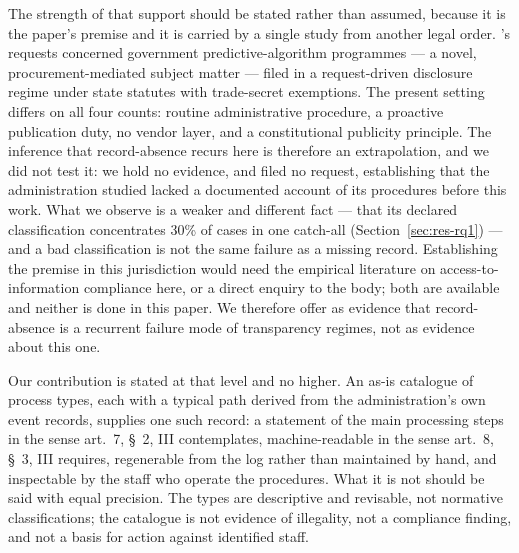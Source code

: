 The strength of that support should be stated rather than assumed, because it is the paper's
premise and it is carried by a single study from another legal order. \citeauthor{brauneis2018algorithmic}'s
requests concerned government predictive-algorithm programmes --- a novel, procurement-mediated
subject matter --- filed in a request-driven disclosure regime under state statutes with
trade-secret exemptions. The present setting differs on all four counts: routine administrative
procedure, a proactive publication duty, no vendor layer, and a constitutional publicity
principle. The inference that record-absence recurs here is therefore an extrapolation, and we
did not test it: we hold no evidence, and filed no request, establishing that the administration
studied lacked a documented account of its procedures before this work. What we observe is a
weaker and different fact --- that its declared classification concentrates 30\% of cases in one
catch-all (Section~\ref{sec:res-rq1}) --- and a bad classification is not the same failure as a
missing record. Establishing the premise in this jurisdiction would need the empirical
literature on access-to-information compliance here, or a direct enquiry to the body; both are
available and neither is done in this paper. We therefore offer \citeauthor{brauneis2018algorithmic}
as evidence that record-absence is a recurrent failure mode of transparency regimes, not as
evidence about this one.

Our contribution is stated at that level and no higher. An as-is catalogue of process types,
each with a typical path derived from the administration's own event records, supplies one
such record: a statement of the main processing steps in the sense art.~7, \S~2, III
contemplates, machine-readable in the sense art.~8, \S~3, III requires, regenerable from
the log rather than maintained by hand, and inspectable by the staff who operate the
procedures. What it is not should be said with equal precision. The types are descriptive
and revisable, not normative classifications; the catalogue is not evidence of illegality,
not a compliance finding, and not a basis for action against identified staff.

